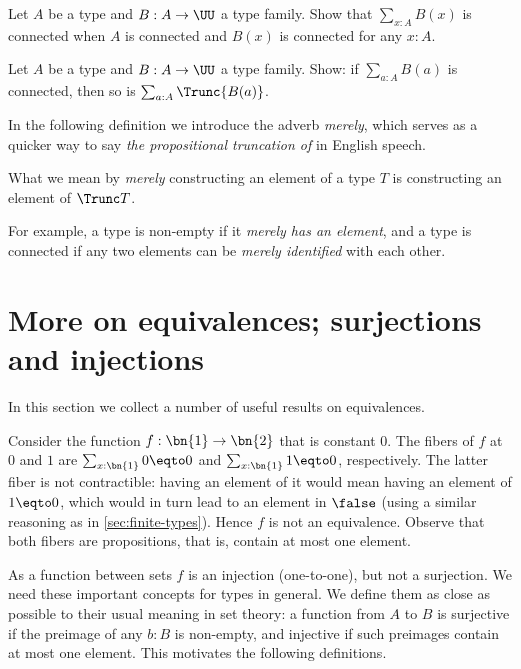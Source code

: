 \begin{xca}\label{xca:connected-trivia-1}
  Let $A$ be a type and $B:A\to\UU$ a type family.
  Show that $\sum_{x:A}B(x)$ is connected when $A$ is connected
  and $B(x)$ is connected for any $x:A$.
\end{xca}

\begin{xca}\label{xca:connected-trivia-2}
Let $A$ be a type and $B:A\to\UU$ a type family. Show: if
$\sum_{a:A}B(a)$ is connected, then so is $\sum_{a:A}\Trunc{B(a)}$. 
\end{xca}

In the following definition we introduce the adverb \emph{merely}, which serves as a quicker way to say \emph{the propositional truncation of}
in English speech.

\begin{definition}\label{def:merely}
  What we mean by \emph{merely} constructing an element of a type $T$ is constructing an element of $\Trunc T$.
\end{definition}

For example, a type is non-empty if it \emph{merely has an element}, and a type is connected if any two elements can be
\emph{merely identified} with each other.


\section{More on equivalences; surjections and injections}
\label{sec:more-on-equivalences}

In this section we collect a number of useful results on equivalences.

Consider the function $f:\bn{1}\to\bn{2}$ that is constant $0$.
The fibers of $f$ at $0$ and $1$ are $\sum_{x:\bn{1}} 0\eqto 0$
and $\sum_{x:\bn{1}} 1\eqto 0$, respectively.
The latter fiber is not contractible: having an element
of it would mean having an element of $1\eqto 0$,
which would in turn lead to an element in $\false$
(using a similar reasoning as in \cref{sec:finite-types}).
Hence $f$ is not an equivalence.
Observe that both fibers are propositions,
that is, contain at most one element.

As a function between sets
$f$ is an injection (one-to-one), but not a surjection.
We need these important concepts for types in general.
We define them as close as possible to their
usual meaning in set theory: a function from $A$ to $B$ is
surjective if the preimage of any $b:B$ is non-empty,
and injective if such preimages contain at most one element.
This motivates the following definitions.

